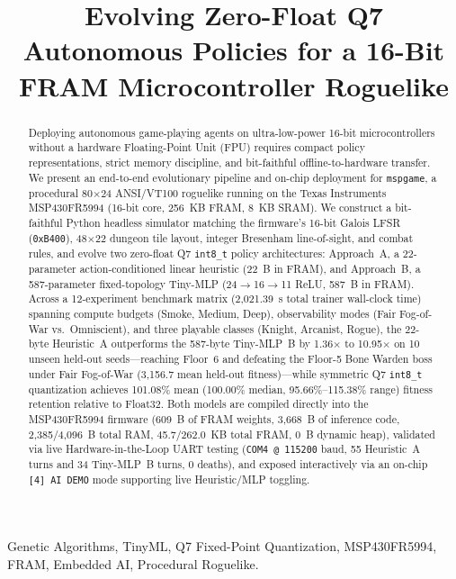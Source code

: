 \documentclass[conference]{IEEEtran}
\title{Evolving Zero-Float Q7 Autonomous Policies for a 16-Bit FRAM Microcontroller Roguelike}
\author{\IEEEauthorblockN{joaogpd}
\IEEEauthorblockA{\textit{mspgame Embedded Systems Project} \\
TI MSP430FR5994 LaunchPad Platform}}
\begin{document}
\maketitle

\begin{abstract}
Deploying autonomous game-playing agents on ultra-low-power 16-bit microcontrollers without a hardware Floating-Point Unit (FPU) requires compact policy representations, strict memory discipline, and bit-faithful offline-to-hardware transfer. We present an end-to-end evolutionary pipeline and on-chip deployment for \texttt{mspgame}, a procedural 80$\times$24 ANSI/VT100 roguelike running on the Texas Instruments MSP430FR5994 (16-bit core, 256~KB FRAM, 8~KB SRAM). We construct a bit-faithful Python headless simulator matching the firmware's 16-bit Galois LFSR (\texttt{0xB400}), 48$\times$22 dungeon tile layout, integer Bresenham line-of-sight, and combat rules, and evolve two zero-float Q7 \texttt{int8\_t} policy architectures: Approach~A, a 22-parameter action-conditioned linear heuristic (22~B in FRAM), and Approach~B, a 587-parameter fixed-topology Tiny-MLP (24$\rightarrow$16$\rightarrow$11 ReLU, 587~B in FRAM). Across a 12-experiment benchmark matrix (2,021.39~s total trainer wall-clock time) spanning compute budgets (Smoke, Medium, Deep), observability modes (Fair Fog-of-War vs.\ Omniscient), and three playable classes (Knight, Arcanist, Rogue), the 22-byte Heuristic~A outperforms the 587-byte Tiny-MLP~B by 1.36$\times$ to 10.95$\times$ on 10 unseen held-out seeds---reaching Floor~6 and defeating the Floor-5 Bone Warden boss under Fair Fog-of-War (3,156.7 mean held-out fitness)---while symmetric Q7 \texttt{int8\_t} quantization achieves 101.08\% mean (100.00\% median, 95.66\%--115.38\% range) fitness retention relative to Float32. Both models are compiled directly into the MSP430FR5994 firmware (609~B of FRAM weights, 3,668~B of inference code, 2,385/4,096~B total RAM, 45.7/262.0~KB total FRAM, 0~B dynamic heap), validated via live Hardware-in-the-Loop UART testing (\texttt{COM4 @ 115200} baud, 55 Heuristic~A turns and 34 Tiny-MLP~B turns, 0 deaths), and exposed interactively via an on-chip \texttt{[4] AI DEMO} mode supporting live Heuristic/MLP toggling.
\end{abstract}

\begin{IEEEkeywords}
Genetic Algorithms, TinyML, Q7 Fixed-Point Quantization, MSP430FR5994, FRAM, Embedded AI, Procedural Roguelike.
\end{IEEEkeywords}
\end{document}
